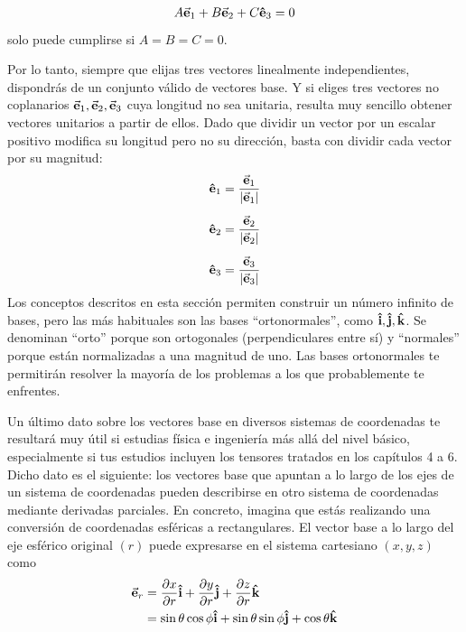 \documentclass[hidelinks,12pt]{article}
\begin{document}
\begin{align}
    A \va{e}_{1} + B \va{e}_{2} + C \vu{e}_{3} = 0
    \label{eq:ecuacion_01_18}
\end{align}
solo puede cumplirse si $A = B = C = 0$.
\par
Por lo tanto, siempre que elijas tres vectores linealmente independientes, dispondrás de un conjunto válido de vectores base. Y si eliges tres vectores no coplanarios $\va{e}_{1}, \va{e}_{2}, \va{e}_{3}$ cuya longitud no sea unitaria, resulta muy sencillo obtener vectores unitarios a partir de ellos. Dado que dividir un vector por un escalar positivo modifica su longitud pero no su dirección, basta con dividir cada vector por su magnitud:
\begin{align}
\begin{aligned}
    \vu{e}_{1} &= \dfrac{\va{e}_{1}}{\abs{\va{e}_{1}}} \\[0.5em]
    \vu{e}_{2} &= \dfrac{\va{e}_{2}}{\abs{\va{e}_{2}}} \\[0.5em]
    \vu{e}_{3} &= \dfrac{\va{e}_{3}}{\abs{\va{e}_{3}}}
\end{aligned}
\label{eq:ecuacion_01_19}
\end{align}
Los conceptos descritos en esta sección permiten construir un número infinito de bases, pero las más habituales son las bases \enquote{ortonormales}, como $\vu{i}, \vu{j}, \vu{k}$. Se denominan \enquote{orto} porque son ortogonales (perpendiculares entre sí) y \enquote{normales} porque están normalizadas a una magnitud de uno. Las bases ortonormales te permitirán resolver la mayoría de los problemas a los que probablemente te enfrentes.
\par
Un último dato sobre los vectores base en diversos sistemas de coordenadas te resultará muy útil si estudias física e ingeniería más allá del nivel básico, especialmente si tus estudios incluyen los tensores tratados en los capítulos 4 a 6. Dicho dato es el siguiente: los vectores base que apuntan a lo largo de los ejes de un sistema de coordenadas pueden describirse en otro sistema de coordenadas mediante derivadas parciales. En concreto, imagina que estás realizando una conversión de coordenadas esféricas a rectangulares. El vector base a lo largo del eje esférico original $(r)$ puede expresarse en el sistema cartesiano $(x, y, z)$ como
\begin{align*}
    \va{e}_{r} &= \pdv{x}{r} \vu{i} + \pdv{y}{r} \vu{j} + \pdv{z}{r} \vu{k} \\
    &= \sin \theta \cos \phi \vu{i} + \sin \theta \sin \phi \vu{j} + \cos \theta \vu{k}
\end{align*}  
\end{document}
